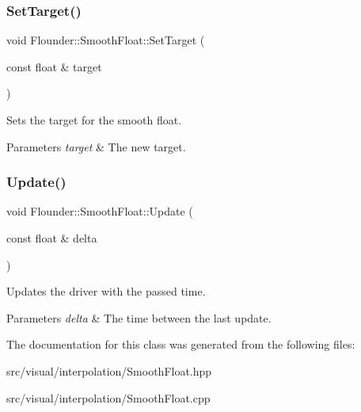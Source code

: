 \subsubsection{\texorpdfstring{Set\+Target()}{SetTarget()}}
{\footnotesize\ttfamily void Flounder\+::\+Smooth\+Float\+::\+Set\+Target (\begin{DoxyParamCaption}\item[{const float \&}]{target }\end{DoxyParamCaption})\hspace{0.3cm}{\ttfamily [inline]}}



Sets the target for the smooth float. 


\begin{DoxyParams}{Parameters}
{\em target} & The new target. \\
\hline
\end{DoxyParams}
\mbox{\label{class_flounder_1_1_smooth_float_ad9524cd3d215767fa93451745fca471f}} 
\subsubsection{\texorpdfstring{Update()}{Update()}}
{\footnotesize\ttfamily void Flounder\+::\+Smooth\+Float\+::\+Update (\begin{DoxyParamCaption}\item[{const float \&}]{delta }\end{DoxyParamCaption})}



Updates the driver with the passed time. 


\begin{DoxyParams}{Parameters}
{\em delta} & The time between the last update. \\
\hline
\end{DoxyParams}


The documentation for this class was generated from the following files\+:\begin{DoxyCompactItemize}
\item 
src/visual/interpolation/Smooth\+Float.\+hpp\item 
src/visual/interpolation/Smooth\+Float.\+cpp\end{DoxyCompactItemize}
